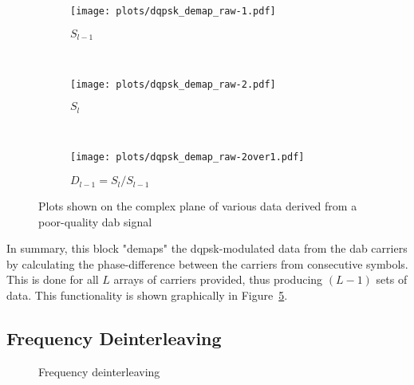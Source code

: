 \documentclass[class=report,11pt,crop=false]{standalone}
\begin{document}
\begin{figure}[htbp]
  \centering
  \captionsetup{type=figure}
  \begin{subfigure}[t]{0.3\textwidth}
    \centering
    \captionsetup{type=figure}
    \texttt{[image: plots/dqpsk\_demap\_raw-1.pdf]}
    \caption{\(S_{l-1}\)}
    \label{fig:dqpsk_demap_raw-1}
  \end{subfigure}%
  ~ 
  \begin{subfigure}[t]{0.3\textwidth}
    \centering
    \captionsetup{type=figure}
    \texttt{[image: plots/dqpsk\_demap\_raw-2.pdf]}
    \caption{\(S_{l}\)}
    \label{fig:dqpsk_demap_raw-2}
  \end{subfigure}
  ~ 
  \begin{subfigure}[t]{0.3\textwidth}
    \centering
    \captionsetup{type=figure}
    \texttt{[image: plots/dqpsk\_demap\_raw-2over1.pdf]}
    \caption{\(D_{l-1} = S_{l}/S_{l-1}\)}
    \label{fig:dqpsk_demap_raw-2over1}
  \end{subfigure}
  \caption{Plots shown on the complex plane of various data derived from a poor-quality \gls{dab} signal}
  \label{fig:dqpsk_demap_raw}
\end{figure}

In summary, this block "demaps" the \gls{dqpsk}-modulated data from the \gls{dab} carriers by calculating the phase-difference between the carriers from consecutive symbols. This is done for all \(L\) arrays of carriers provided, thus producing \((L-1)\) sets of data. This functionality is shown graphically in Figure~\ref{fig:dqpsk_demap}.

\begin{figure}[htbp]
  \centering
  \captionsetup{type=figure}
  \def\svgwidth{\linewidth}
  { %
      }
  \caption{}
  \label{fig:dqpsk_demap}
\end{figure}


\subsection{Frequency Deinterleaving \label{subsect:dab-proc_freq-deinterleave}}

\begin{figure}[htbp]
  \centering
  \captionsetup{type=figure}
  \def\svgwidth{\linewidth}
  { %
      }
  \caption{Frequency deinterleaving}
  \label{fig:freq_deinterleave}
\end{figure}
\end{document}
